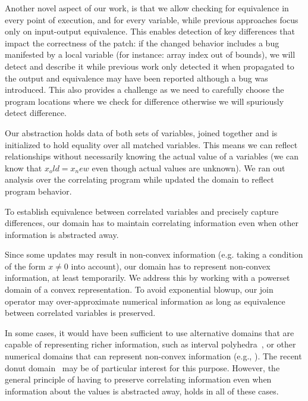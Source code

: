 Another novel aspect of our work, is that we allow checking for equivalence
in every point of execution, and for every variable, while previous
approaches focus only on input-output equivalence. This enables detection of
key differences that impact the correctness of the patch: if the changed
behavior includes a bug manifested by a local variable (for instance: array
index out of bounds), we will detect and describe it while previous work only
detected it when propagated to the output and equivalence may have been
reported although a bug was introduced. This also provides a challenge as we
need to carefully choose the program locations where we check for difference
otherwise we will spuriously detect difference.

Our abstraction holds data of both sets of variables, joined together and is
initialized to hold equality over all matched variables. This means we can
reflect relationships without necessarily knowing the actual value of a
variables (we can know that $x_old = x_new$ even though actual values are
unknown). We ran out analysis over the correlating program while updated the
domain to reflect program behavior.


To establish equivalence between correlated variables and precisely capture
differences, our domain has to maintain correlating information even when
other information is abstracted away.

Since some updates may result in non-convex information (e.g. taking  a
condition of the form $x \neq 0$ into account), our domain has to represent
non-convex information, at least temporarily. We address this by working with
a powerset domain of a convex representation. To avoid exponential blowup,
our join operator may over-approximate numerical information as long as
equivalence between correlated variables is preserved.

In some cases, it would have been sufficient to use alternative domains that
are capable of representing richer information, such as interval
polyhedra~\cite{CMWC:SAS09}, or other numerical domains that can represent
non-convex information (e.g., \cite{TODO}). The recent donut
domain~\cite{GIBMG:VMCAI12} may be of particular interest for this purpose.
However, the general principle of having to preserve correlating information
even when information about the values is abstracted away, holds in all of
these cases.


